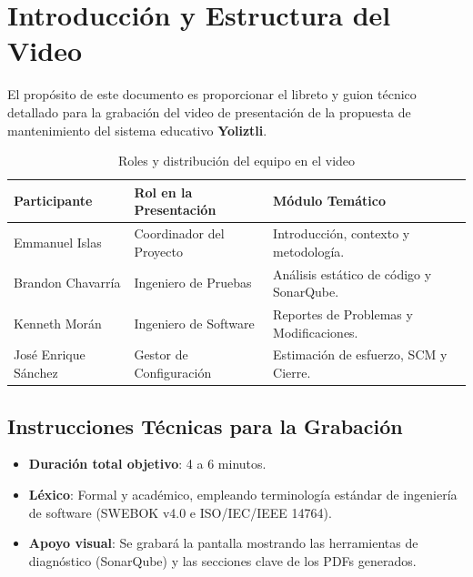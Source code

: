\documentclass[12pt]{article}
\begin{document}
\newpage
{\hypersetup{linkcolor=black}\tableofcontents}
\newpage

\section{Introducción y Estructura del Video}

El propósito de este documento es proporcionar el libreto y guion técnico detallado para la grabación del video de presentación de la propuesta de mantenimiento del sistema educativo \textbf{Yoliztli}. 

\begin{table}[H]
\centering
\begin{tabularx}{\textwidth}{lXX}
\toprule
\textbf{Participante} & \textbf{Rol en la Presentación} & \textbf{Módulo Temático} \\
\midrule
Emmanuel Islas & Coordinador del Proyecto & Introducción, contexto y metodología. \\
Brandon Chavarría & Ingeniero de Pruebas & Análisis estático de código y SonarQube. \\
Kenneth Morán & Ingeniero de Software & Reportes de Problemas y Modificaciones. \\
José Enrique Sánchez & Gestor de Configuración & Estimación de esfuerzo, SCM y Cierre. \\
\bottomrule
\end{tabularx}
\caption{Roles y distribución del equipo en el video}
\end{table}

\subsection{Instrucciones Técnicas para la Grabación}
\begin{itemize}
    \item \textbf{Duración total objetivo}: 4 a 6 minutos.
    \item \textbf{Léxico}: Formal y académico, empleando terminología estándar de ingeniería de software (SWEBOK v4.0 e ISO/IEC/IEEE 14764).
    \item \textbf{Apoyo visual}: Se grabará la pantalla mostrando las herramientas de diagnóstico (SonarQube) y las secciones clave de los PDFs generados.
\end{itemize}

\newpage

\end{document}
